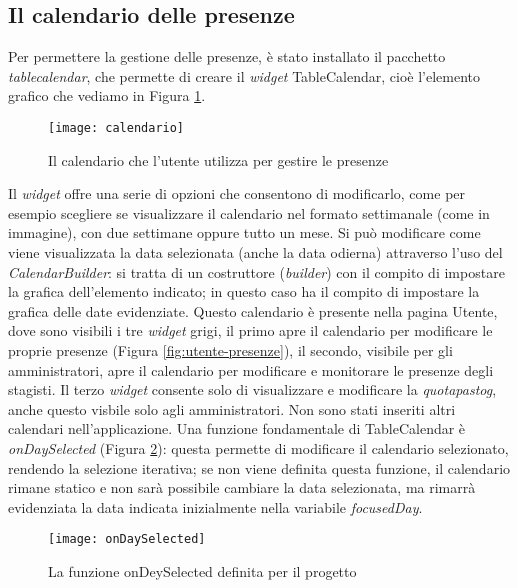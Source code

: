 \newpage

\subsection{Il calendario delle presenze}

Per permettere la gestione delle presenze, è stato installato il pacchetto \emph{table\textunderscore calendar}, che permette di creare il \emph{widget} TableCalendar, cioè l'elemento grafico che vediamo in Figura \ref{fig:calendario}.
\begin{figure}[!h] 
    \centering 
    \texttt{[image: calendario]} 
    \caption{Il calendario che l'utente utilizza per gestire le presenze}
    \label{fig:calendario}
\end{figure}

Il \emph{widget} offre una serie di opzioni che consentono di modificarlo, come per esempio scegliere se visualizzare il calendario nel formato settimanale (come in immagine), con due settimane oppure tutto un mese.\newline
Si può modificare come viene visualizzata la data selezionata (anche la data odierna) attraverso l'uso del \emph{CalendarBuilder}: si tratta di un costruttore (\emph{builder}) con il compito di impostare la grafica dell'elemento indicato; in questo caso ha il compito di impostare la grafica delle date evidenziate.\newline
\newline
Questo calendario è presente nella pagina Utente, dove sono visibili i tre \emph{widget} grigi, il primo apre il calendario per modificare le proprie presenze (Figura \ref{fig:utente-presenze}), il secondo, visibile per gli amministratori, apre il calendario per modificare e monitorare le presenze degli stagisti.\newline
Il terzo \emph{widget} consente solo di visualizzare e modificare la \emph{\gls{quotapastog}}, anche questo visbile solo agli amministratori.\newline
Non sono stati inseriti altri calendari nell'applicazione.\newline
\newline
Una funzione fondamentale di TableCalendar è \emph{onDaySelected} (Figura \ref{fig:funzione-ondayselected}): questa permette di modificare il calendario selezionato, rendendo la selezione iterativa; se non viene definita questa funzione, il calendario rimane statico e non sarà possibile cambiare la data selezionata, ma rimarrà evidenziata la data indicata inizialmente nella variabile \emph{focusedDay}.\newline
\begin{figure}[!h] 
    \centering 
    \texttt{[image: onDaySelected]} 
    \caption{La funzione onDeySelected definita per il progetto}
    \label{fig:funzione-ondayselected}
\end{figure}

